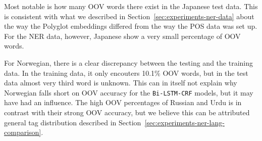 Most notable is how many OOV words there exist in the Japanese test data.
This is consistent with what we described in
Section~\ref{sec:experiments-ner-data} about the way the Polyglot embeddings
differed from the way the POS data was set up. For the NER data, however,
Japanese show a very small percentage of OOV words.

For Norwegian, there is a clear discrepancy between the testing and the training
data. In the training data, it only encouters 10.1\% OOV words, but in the test
data almost very third word is unknown. This can in itself not explain why
Norwegian falls short on OOV accuracy for the \texttt{Bi-LSTM-CRF} models, but
it may have had an influence. The high OOV percentages of Russian and Urdu is in
contrast with their strong OOV accuracy, but we believe this can be attributed
general tag distribution described in
Section~\ref{sec:experiments-ner-lang-comparison}.

